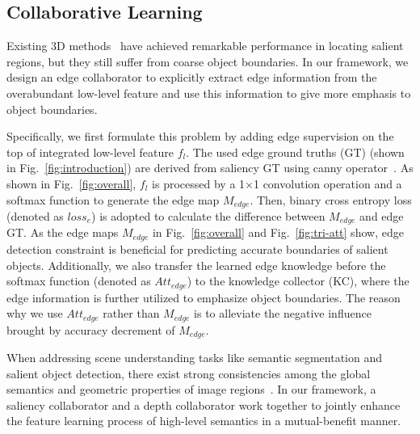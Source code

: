 \documentclass[runningheads]{llncs}
\begin{document}
\subsection{Collaborative Learning}
\label{subsection:3.3}
Existing 3D methods~\cite{3DDF,3DPCA,3DTANet,3DDMRA,3DCPFP} have achieved remarkable performance in locating salient regions, but they still suffer from coarse object boundaries.
In our framework, we design an edge collaborator to explicitly extract edge information from the overabundant low-level feature and use this information to give more emphasis to object boundaries.


Specifically, we first formulate this problem by adding edge supervision on the top of integrated low-level feature $f_l$.
The used edge ground truths (GT) (shown in Fig.~\ref{fig:introduction}) are derived from saliency GT using canny operator~\cite{Canny}.
As shown in Fig.~\ref{fig:overall}, $f_l$ is processed by a 1$\times$1 convolution operation and a softmax function to generate the edge map $M_{edge}$.
Then, binary cross entropy loss (denoted as ${loss}_{e}$) is adopted to calculate the difference between $M_{edge}$ and edge GT.
As the edge maps $M_{edge}$ in Fig.~\ref{fig:overall} and Fig.~\ref{fig:tri-att} show,
edge detection constraint is beneficial for predicting accurate boundaries of salient objects.
Additionally, we also transfer the learned edge knowledge before the softmax function (denoted as $Att_{edge}$) to the knowledge collector (KC), where the edge information is further utilized to emphasize object boundaries.
The reason why we use $Att_{edge}$ rather than $M_{edge}$ is to alleviate the negative influence brought by accuracy decrement of $M_{edge}$.





When addressing scene understanding tasks like semantic segmentation and salient object detection, there exist strong consistencies among the global semantics and geometric properties of image regions~\cite{Towards}.
In our framework, a saliency collaborator and a depth collaborator work together to jointly enhance the feature learning process of high-level semantics in a mutual-benefit manner.
\end{document}
